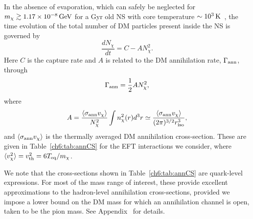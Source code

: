 In the absence of evaporation, which can safely be neglected for $m_\chi \gtrsim 1.17\times 10^{-8}{\rm \,GeV}$ for a Gyr old NS with core temperature $\sim 10^3{\rm \,K}$~\cite{Bell:2020lmm_mar_ImprovedTreatmentDark}, the time evolution of the total number of DM particles present inside the NS is governed by
\begin{equation}
    \frac{dN_\chi}{dt} = C - A N_\chi^2 \label{ch6:eq:ndm}.
\end{equation}
Here $C$ is the capture rate and  $A$ is related to the DM annihilation rate, $\Gamma_{\rm ann}$, through
\begin{equation}
    \Gamma_{\rm ann} =  \frac{1}{2}A N_\chi^2,
\end{equation}
where
\begin{equation}
    A = \frac{\langle \sigma_\text{ann}v_\chi \rangle}{N_\chi^2} \int n_\chi^2(r) d^3 r \simeq \frac{\langle \sigma_\text{ann} v_\chi\rangle}{(2\pi)^{3/2} r_{\rm iso}^3}, \label{ch6:eq:annrate}
\end{equation}
and $\langle \sigma_{\rm ann} v_\chi \rangle$ is the
thermally averaged DM annihilation cross-section. These are given in Table~\ref{ch6:tab:annCS} for the EFT interactions we consider, where $\langle v^2_\chi \rangle = v_{\rm th}^2 =  6 T_{\rm eq}/ m_\chi$.


We note that the cross-sections shown in Table~\ref{ch6:tab:annCS} are quark-level expressions. For most of the mass range of interest, these provide excellent approximations to the hadron-level annihilation cross-sections, provided we impose a lower bound on the DM mass for which an annihilation channel is open, taken to be the pion mass. See Appendix~ for details.




